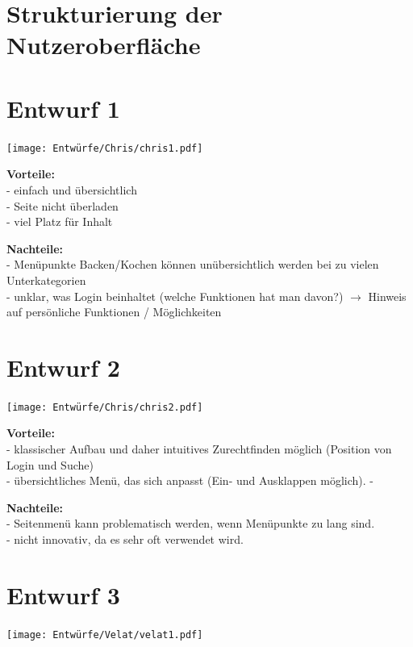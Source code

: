 \documentclass[parskip,10pt,abstracton]{scrartcl}
\begin{document}
\section{Strukturierung der Nutzeroberfläche}


\section*{Entwurf 1} %

\texttt{[image: Entwürfe/Chris/chris1.pdf]}


\textbf{Vorteile:} \\
- einfach und übersichtlich\\
- Seite nicht überladen\\
- viel Platz für Inhalt

\textbf{Nachteile:} \\
- Menüpunkte Backen/Kochen können unübersichtlich werden bei zu vielen Unterkategorien\\
- unklar, was Login beinhaltet (welche Funktionen hat man davon?) $\to$ Hinweis auf persönliche Funktionen / Möglichkeiten

\section*{Entwurf 2} %

\texttt{[image: Entwürfe/Chris/chris2.pdf]}

\textbf{Vorteile:}\\
- klassischer Aufbau und daher intuitives Zurechtfinden möglich (Position von Login und Suche) \\
- übersichtliches Menü, das sich anpasst (Ein- und Ausklappen möglich).
-

\textbf{Nachteile:}\\
- Seitenmenü kann problematisch werden, wenn Menüpunkte zu lang sind.\\
- nicht innovativ, da es sehr oft verwendet wird.


\section*{Entwurf 3} %

\texttt{[image: Entwürfe/Velat/velat1.pdf]}
\end{document}
